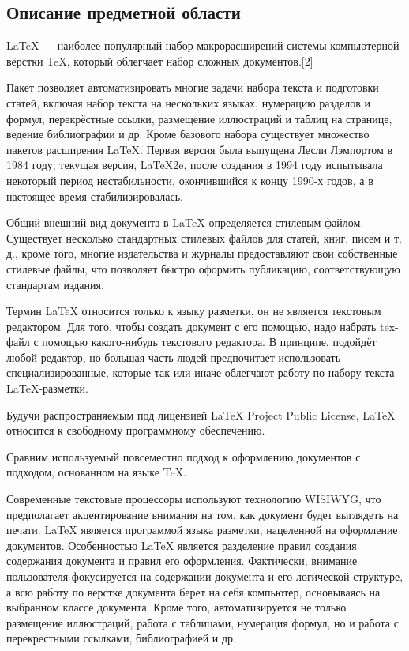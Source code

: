 \newpage
\begin{center}
\section{\fontsize{16pt}{16.8pt}Описание предметной области}
\end{center}
\par
\fontsize{14pt}{16.8pt}\selectfont
LaTeX — наиболее популярный набор макрорасширений системы компьютерной вёрстки TeX, который облегчает набор сложных документов.[2]
\par
\fontsize{14pt}{16.8pt}\selectfont
Пакет позволяет автоматизировать многие задачи набора текста и подготовки статей, включая набор текста на нескольких языках, нумерацию разделов и формул, перекрёстные ссылки, размещение иллюстраций и таблиц на странице, ведение библиографии и др. Кроме базового набора существует множество пакетов расширения LaTeX. Первая версия была выпущена Лесли Лэмпортом в 1984 году; текущая версия, LaTeX2e, после создания в 1994 году испытывала некоторый период нестабильности, окончившийся к концу 1990-х годов, а в настоящее время стабилизировалась.
\par
\fontsize{14pt}{16.8pt}\selectfont
Общий внешний вид документа в LaTeX определяется стилевым файлом. Существует несколько стандартных стилевых файлов для статей, книг, писем и т. д., кроме того, многие издательства и журналы предоставляют свои собственные стилевые файлы, что позволяет быстро оформить публикацию, соответствующую стандартам издания.
\par
\fontsize{14pt}{16.8pt}\selectfont
Термин LaTeX относится только к языку разметки, он не является текстовым редактором. Для того, чтобы создать документ с его помощью, надо набрать tex-файл с помощью какого-нибудь текстового редактора. В принципе, подойдёт любой редактор, но большая часть людей предпочитает использовать специализированные, которые так или иначе облегчают работу по набору текста LaTeX-разметки.
\par
\fontsize{14pt}{16.8pt}\selectfont
Будучи распространяемым под лицензией LaTeX Project Public License, LaTeX относится к свободному программному обеспечению.
\par
\fontsize{14pt}{16.8pt}\selectfont
Сравним используемый повсеместно подход к оформлению документов с подходом, основанном на языке TeX.
\par
\fontsize{14pt}{16.8pt}\selectfont
Современные текстовые процессоры используют технологию WISIWYG, что предполагает акцентирование внимания на том, как документ будет выглядеть на печати. LaTeX является программой языка разметки, нацеленной на оформление документов. Особенностью LaTeX является разделение правил создания содержания документа и правил его оформления. Фактически, внимание пользователя фокусируется на содержании документа и его логической структуре, а всю работу по верстке документа берет на себя компьютер, основываясь на выбранном классе документа. Кроме того, автоматизируется не только размещение иллюстраций, работа с таблицами, нумерация формул, но и работа с перекрестными ссылками, библиографией и др.

